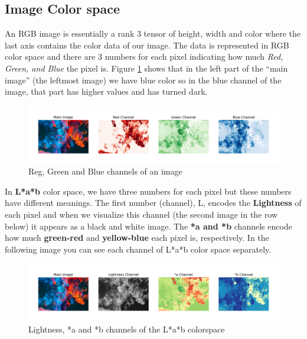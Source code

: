 \documentclass[oneside,a4paper,12pt]{report}
\begin{document}
\subsection{Image Color space}
\hspace*{0.25 in}An RGB image is essentially a rank 3 tensor of height, width and color where the last axis contains the color data of our image. The data is represented in RGB color space and there are 3 numbers for each pixel indicating how much \textit{Red, Green, and Blue} the pixel is. Figure \ref{rgb_colorspace} shows that in the left part of the “main image” (the leftmost image) we have blue color so in the blue channel of the image, that part has higher values and has turned dark.\\
\begin{figure}[!htb]
\begin{center}
	\includegraphics[width=\textwidth]{figures/rgb_colorspace}
	\caption{Reg, Green and Blue channels of an image}
	\label{rgb_colorspace}
\end{center}
\end{figure}

In \textbf{L*a*b} color space, we have three numbers for each pixel but these numbers have different meanings. The first number (channel), L, encodes the \textbf{Lightness} of each pixel and when we visualize this channel (the second image in the row below) it appears as a black and white image. The \textbf{*a and *b} channels encode how much \textbf{green-red} and \textbf{yellow-blue} each pixel is, respectively. In the following image you can see each channel of L*a*b color space separately.

\begin{figure}[!htb]
\begin{center}
	\includegraphics[width=\textwidth]{figures/Lab_colorspace}
	\caption{Lightness, *a and *b channels of the L*a*b colorspace}
	\label{lab_colorspace}
\end{center}
\end{figure}
\end{document}
